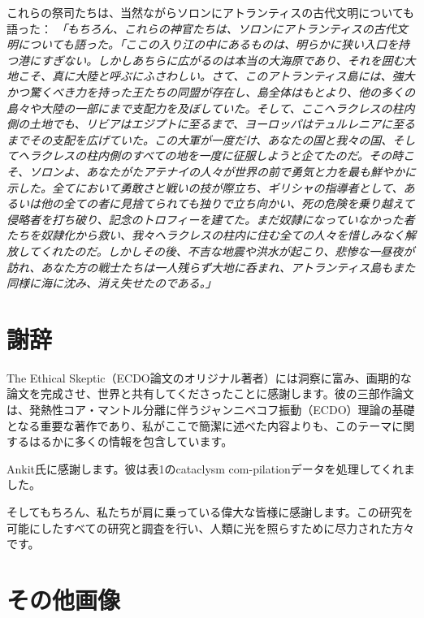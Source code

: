 \documentclass[10pt,twocolumn,letterpaper]{article}
\begin{document}
これらの祭司たちは、当然ながらソロンにアトランティスの古代文明についても語った： \textit{「もちろん、これらの神官たちは、ソロンにアトランティスの古代文明についても語った。「ここの入り江の中にあるものは、明らかに狭い入口を持つ港にすぎない。しかしあちらに広がるのは本当の大海原であり、それを囲む大地こそ、真に大陸と呼ぶにふさわしい。さて、このアトランティス島には、強大かつ驚くべき力を持った王たちの同盟が存在し、島全体はもとより、他の多くの島々や大陸の一部にまで支配力を及ぼしていた。そして、ここヘラクレスの柱内側の土地でも、リビアはエジプトに至るまで、ヨーロッパはテュルレニアに至るまでその支配を広げていた。この大軍が一度だけ、あなたの国と我々の国、そしてヘラクレスの柱内側のすべての地を一度に征服しようと企てたのだ。その時こそ、ソロンよ、あなたがたアテナイの人々が世界の前で勇気と力を最も鮮やかに示した。全てにおいて勇敢さと戦いの技が際立ち、ギリシャの指導者として、あるいは他の全ての者に見捨てられても独りで立ち向かい、死の危険を乗り越えて侵略者を打ち破り、記念のトロフィーを建てた。まだ奴隷になっていなかった者たちを奴隷化から救い、我々ヘラクレスの柱内に住む全ての人々を惜しみなく解放してくれたのだ。しかしその後、不吉な地震や洪水が起こり、悲惨な一昼夜が訪れ、あなた方の戦士たちは一人残らず大地に呑まれ、アトランティス島もまた同様に海に沈み、消え失せたのである。」}

\section{謝辞}

The Ethical Skeptic（ECDO論文のオリジナル著者）には洞察に富み、画期的な論文を完成させ、世界と共有してくださったことに感謝します。彼の三部作論文 \cite{1} は、発熱性コア・マントル分離に伴うジャンニベコフ振動（ECDO）理論の基礎となる重要な著作であり、私がここで簡潔に述べた内容よりも、このテーマに関するはるかに多くの情報を包含しています。

Ankit氏に感謝します。彼は表1のcataclysm com-pilationデータを処理してくれました。

そしてもちろん、私たちが肩に乗っている偉大な皆様に感謝します。この研究を可能にしたすべての研究と調査を行い、人類に光を照らすために尽力された方々です。

\clearpage
\twocolumn

\section{その他画像}

\end{document}
